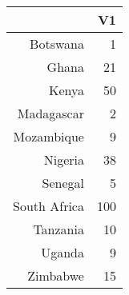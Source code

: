 \begin{table}[ht]
\centering
\begin{tabular}{rr}
  \hline
 & V1 \\ 
  \hline
Botswana &   1 \\ 
  Ghana &  21 \\ 
  Kenya &  50 \\ 
  Madagascar &   2 \\ 
  Mozambique &   9 \\ 
  Nigeria &  38 \\ 
  Senegal &   5 \\ 
  South Africa & 100 \\ 
  Tanzania &  10 \\ 
  Uganda &   9 \\ 
  Zimbabwe &  15 \\ 
   \hline
\end{tabular}
\end{table}
